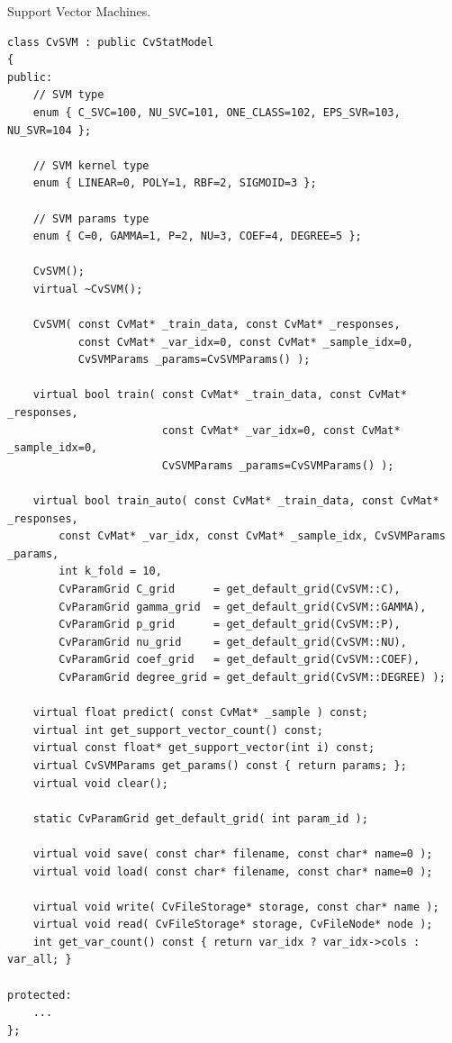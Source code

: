 
Support Vector Machines.

\begin{lstlisting}
class CvSVM : public CvStatModel
{
public:
    // SVM type
    enum { C_SVC=100, NU_SVC=101, ONE_CLASS=102, EPS_SVR=103, NU_SVR=104 };

    // SVM kernel type
    enum { LINEAR=0, POLY=1, RBF=2, SIGMOID=3 };

    // SVM params type
    enum { C=0, GAMMA=1, P=2, NU=3, COEF=4, DEGREE=5 };

    CvSVM();
    virtual ~CvSVM();

    CvSVM( const CvMat* _train_data, const CvMat* _responses,
           const CvMat* _var_idx=0, const CvMat* _sample_idx=0,
           CvSVMParams _params=CvSVMParams() );

    virtual bool train( const CvMat* _train_data, const CvMat* _responses,
                        const CvMat* _var_idx=0, const CvMat* _sample_idx=0,
                        CvSVMParams _params=CvSVMParams() );

    virtual bool train_auto( const CvMat* _train_data, const CvMat* _responses,
        const CvMat* _var_idx, const CvMat* _sample_idx, CvSVMParams _params,
        int k_fold = 10,
        CvParamGrid C_grid      = get_default_grid(CvSVM::C),
        CvParamGrid gamma_grid  = get_default_grid(CvSVM::GAMMA),
        CvParamGrid p_grid      = get_default_grid(CvSVM::P),
        CvParamGrid nu_grid     = get_default_grid(CvSVM::NU),
        CvParamGrid coef_grid   = get_default_grid(CvSVM::COEF),
        CvParamGrid degree_grid = get_default_grid(CvSVM::DEGREE) );

    virtual float predict( const CvMat* _sample ) const;
    virtual int get_support_vector_count() const;
    virtual const float* get_support_vector(int i) const;
    virtual CvSVMParams get_params() const { return params; };
    virtual void clear();

    static CvParamGrid get_default_grid( int param_id );

    virtual void save( const char* filename, const char* name=0 );
    virtual void load( const char* filename, const char* name=0 );

    virtual void write( CvFileStorage* storage, const char* name );
    virtual void read( CvFileStorage* storage, CvFileNode* node );
    int get_var_count() const { return var_idx ? var_idx->cols : var_all; }

protected:
    ...
};

\end{lstlisting}


